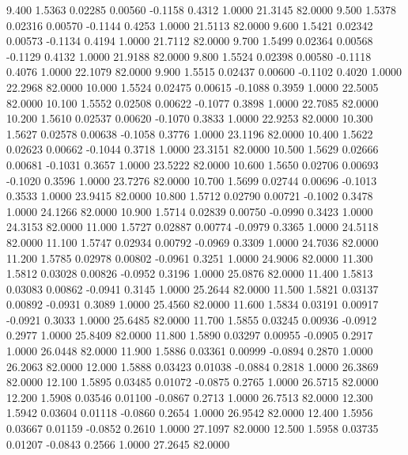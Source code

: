    9.400   1.5363   0.02285   0.00560  -0.1158   0.4312   1.0000  21.3145  82.0000
   9.500   1.5378   0.02316   0.00570  -0.1144   0.4253   1.0000  21.5113  82.0000
   9.600   1.5421   0.02342   0.00573  -0.1134   0.4194   1.0000  21.7112  82.0000
   9.700   1.5499   0.02364   0.00568  -0.1129   0.4132   1.0000  21.9188  82.0000
   9.800   1.5524   0.02398   0.00580  -0.1118   0.4076   1.0000  22.1079  82.0000
   9.900   1.5515   0.02437   0.00600  -0.1102   0.4020   1.0000  22.2968  82.0000
  10.000   1.5524   0.02475   0.00615  -0.1088   0.3959   1.0000  22.5005  82.0000
  10.100   1.5552   0.02508   0.00622  -0.1077   0.3898   1.0000  22.7085  82.0000
  10.200   1.5610   0.02537   0.00620  -0.1070   0.3833   1.0000  22.9253  82.0000
  10.300   1.5627   0.02578   0.00638  -0.1058   0.3776   1.0000  23.1196  82.0000
  10.400   1.5622   0.02623   0.00662  -0.1044   0.3718   1.0000  23.3151  82.0000
  10.500   1.5629   0.02666   0.00681  -0.1031   0.3657   1.0000  23.5222  82.0000
  10.600   1.5650   0.02706   0.00693  -0.1020   0.3596   1.0000  23.7276  82.0000
  10.700   1.5699   0.02744   0.00696  -0.1013   0.3533   1.0000  23.9415  82.0000
  10.800   1.5712   0.02790   0.00721  -0.1002   0.3478   1.0000  24.1266  82.0000
  10.900   1.5714   0.02839   0.00750  -0.0990   0.3423   1.0000  24.3153  82.0000
  11.000   1.5727   0.02887   0.00774  -0.0979   0.3365   1.0000  24.5118  82.0000
  11.100   1.5747   0.02934   0.00792  -0.0969   0.3309   1.0000  24.7036  82.0000
  11.200   1.5785   0.02978   0.00802  -0.0961   0.3251   1.0000  24.9006  82.0000
  11.300   1.5812   0.03028   0.00826  -0.0952   0.3196   1.0000  25.0876  82.0000
  11.400   1.5813   0.03083   0.00862  -0.0941   0.3145   1.0000  25.2644  82.0000
  11.500   1.5821   0.03137   0.00892  -0.0931   0.3089   1.0000  25.4560  82.0000
  11.600   1.5834   0.03191   0.00917  -0.0921   0.3033   1.0000  25.6485  82.0000
  11.700   1.5855   0.03245   0.00936  -0.0912   0.2977   1.0000  25.8409  82.0000
  11.800   1.5890   0.03297   0.00955  -0.0905   0.2917   1.0000  26.0448  82.0000
  11.900   1.5886   0.03361   0.00999  -0.0894   0.2870   1.0000  26.2063  82.0000
  12.000   1.5888   0.03423   0.01038  -0.0884   0.2818   1.0000  26.3869  82.0000
  12.100   1.5895   0.03485   0.01072  -0.0875   0.2765   1.0000  26.5715  82.0000
  12.200   1.5908   0.03546   0.01100  -0.0867   0.2713   1.0000  26.7513  82.0000
  12.300   1.5942   0.03604   0.01118  -0.0860   0.2654   1.0000  26.9542  82.0000
  12.400   1.5956   0.03667   0.01159  -0.0852   0.2610   1.0000  27.1097  82.0000
  12.500   1.5958   0.03735   0.01207  -0.0843   0.2566   1.0000  27.2645  82.0000

